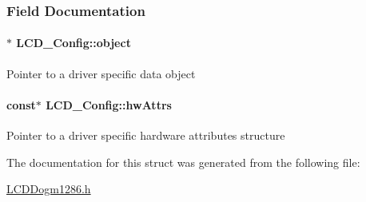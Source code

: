 \subsubsection{Field Documentation}
\paragraph[{object}]{$\ast$ L\-C\-D\-\_\-\-Config\-::object}\label{struct_l_c_d___config_a264b39a3788c4e64089320afa5ad33fc}
Pointer to a driver specific data object 
\paragraph[{hw\-Attrs}]{ const$\ast$ L\-C\-D\-\_\-\-Config\-::hw\-Attrs}\label{struct_l_c_d___config_a76942612562659fe3b3254b24c66f2b9}
Pointer to a driver specific hardware attributes structure 

The documentation for this struct was generated from the following file\-:\begin{DoxyCompactItemize}
\item 
\hyperlink{_l_c_d_dogm1286_8h}{L\-C\-D\-Dogm1286.\-h}\end{DoxyCompactItemize}
